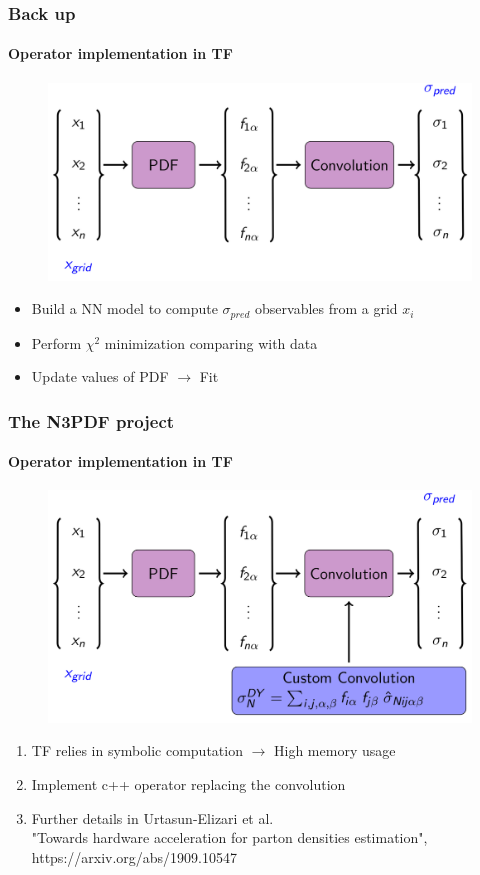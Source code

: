 \documentclass[aspectratio=43]{beamer}
\begin{document}
\begin{frame}
	
	\frametitle{Back up}
	\framesubtitle{Operator implementation in TF}
	
	\begin{figure}
		\includegraphics[width = 8.5 cm]{plots/section2/TF_convolution.png}
	\end{figure}
	
	\begin{itemize}
		\item \footnotesize Build a NN model to compute $\sigma_{pred}$ observables from a grid $x_{i}$
		\item \footnotesize Perform $\chi^{2}$ minimization comparing with data
		\item \footnotesize Update values of PDF $\longrightarrow$ {\color{violet} Fit}
	\end{itemize}

\end{frame}

\begin{frame}
	
	\frametitle{The N3PDF project}
	\framesubtitle{Operator implementation in TF}
	
	\begin{figure}
		\includegraphics[width = 8.5 cm]{plots/section2/TF_convolution2.png}
	\end{figure}
	
	\begin{enumerate}
		\item \footnotesize TF relies in symbolic computation $\longrightarrow$ High memory usage
		\item \footnotesize Implement c++ operator replacing the convolution
		\item Further details in Urtasun-Elizari et al.\\
		{\color{blue}"Towards hardware acceleration for parton densities estimation",\\ https://arxiv.org/abs/1909.10547}
	\end{enumerate}

\end{frame}
\end{document}
